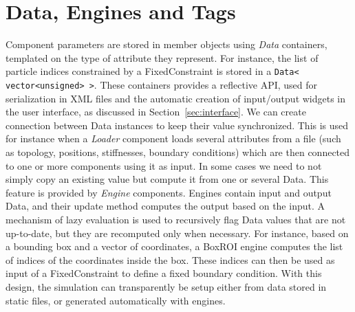 \section{Data, Engines and Tags}

Component parameters are stored in member objects using \textit{Data} containers, templated on the type of attribute they represent.
For instance, the list of particle indices constrained by a FixedConstraint is stored in a \lstinline!Data< vector<unsigned> >!.
These containers provides a reflective API, used for serialization in XML files and the automatic creation of input/output widgets in the user interface, as discussed in Section~\ref{sec:interface}.
We can create connection between Data instances to keep their value synchronized. This is used for instance when a \textit{Loader} component loads several attributes from a file (such as topology, positions, stiffnesses, boundary conditions) which are then connected to one or more components using it as input.
In some cases we need to not simply copy an existing value but compute it from one or several Data. This feature is provided by \textit{Engine} components.
Engines contain input and output Data, and their update method computes the output based on the input.
A mechanism of lazy evaluation is used to recursively flag Data values that are not up-to-date, but they are recomputed only when necessary.
For instance, based on a bounding box and a vector of coordinates, a BoxROI engine computes the list of indices of the coordinates inside the box. These indices can then be used as input of a FixedConstraint to define a fixed boundary condition. With this design, the simulation can transparently be setup either from data stored in static files, or generated automatically with engines.

